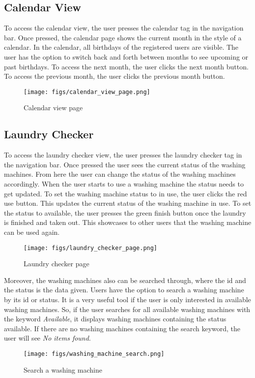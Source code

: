 \documentclass[conference]{IEEEtran}
\begin{document}
\subsection{Calendar View}
To access the calendar view, the user presses the calendar tag in the navigation bar. Once pressed, the calendar page shows the current month in the style of a calendar. In the calendar, all birthdays of the registered users are visible. The user has the option to switch back and forth between months to see upcoming or past birthdays. To access the next month, the user clicks the next month button. To access the previous month, the user clicks the previous month button.
\begin{figure}[H]
\centering
\texttt{[image: figs/calendar\_view\_page.png]}
\caption{Calendar view page}
\label{fig:Calendar view page}
\end{figure}
\subsection{Laundry Checker}
To access the laundry checker view, the user presses the laundry checker tag in the navigation bar. Once pressed the user sees the current status of the washing machines. From here the user can change the status of the washing machines accordingly. When the user starts to use a washing machine the status needs to get updated. To set the washing machine status to in use, the user clicks the red use button. This updates the current status of the washing machine in use. To set the status to available, the user presses the green finish button once the laundry is finished and taken out. This showcases to other users that the washing machine can be used again.
\begin{figure}[H]
\centering
\texttt{[image: figs/laundry\_checker\_page.png]}
\caption{Laundry checker page}
\label{fig:Laundry checker page}
\end{figure}
Moreover, the washing machines also can be searched through, where the id and the status is the data given. Users have the option to search a washing machine by its id or status. It is a very useful tool if the user is only interested in available washing machines. So, if the user searches for all available washing machines with the keyword \textit{Available}, it displays washing machines containing the status available. If there are no washing machines containing the search keyword, the user will see \textit{No items found}.
\begin{figure}[]
\centering
\texttt{[image: figs/washing\_machine\_search.png]}
\caption{Search a washing machine}
\label{fig:Search a washing machine}
\end{figure}
\end{document}
